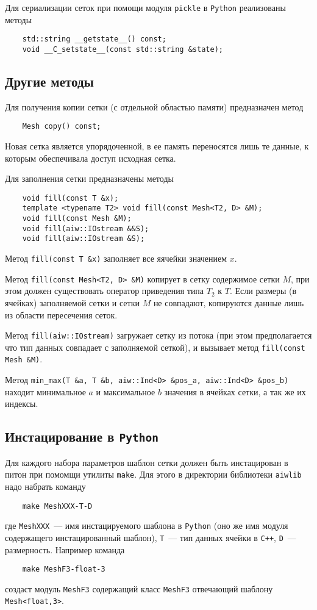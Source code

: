 Для сериализации сеток при помощи модуля \verb'pickle' в \verb'Python' реализованы методы
\begin{verbatim}		
    std::string __getstate__() const; 
    void __C_setstate__(const std::string &state);
\end{verbatim}

		
\subsection{Другие методы}
Для получения копии сетки (с отдельной областью памяти) предназначен метод
\begin{verbatim}		
    Mesh copy() const;
\end{verbatim}
Новая сетка является упорядоченной, в ее память переносятся лишь те данные, к которым обеспечивала доступ исходная сетка.

Для заполнения сетки предназначены методы		
\begin{verbatim}		
    void fill(const T &x);
    template <typename T2> void fill(const Mesh<T2, D> &M);
    void fill(const Mesh &M);
    void fill(aiw::IOstream &&S);
    void fill(aiw::IOstream &S);
\end{verbatim}
Метод \verb'fill(const T &x)' заполняет все яячейки значением $x$.

Метод \verb'fill(const Mesh<T2, D> &M)' копирует в сетку содержимое сетки $M$, при этом должен существовать оператор
приведения типа $T_2$ к $T$. Если размеры (в ячейках) заполняемой сетки и сетки $M$ не совпадают, копируются данные лишь из области пересечения 
сеток.

Метод \verb'fill(aiw::IOstream)' загружает сетку из потока (при этом предполагается что тип данных 
совпадает с заполняемой сеткой), и вызывает метод \verb'fill(const Mesh &M)'.

Метод \verb'min_max(T &a, T &b, aiw::Ind<D> &pos_a, aiw::Ind<D> &pos_b)' находит минимальное $a$ и максимальное $b$
значения в ячейках сетки, а так же их индексы.

\subsection{Инстацирование в {\tt Python}}
Для каждого набора параметров шаблон сетки должен быть инстацирован в питон при помомщи утилиты \verb'make'.
Для этого в директории библиотеки \verb'aiwlib' надо набрать команду
\begin{verbatim}		
    make MeshXXX-T-D
\end{verbatim}
где \verb'MeshXXX'~--- имя инстацируемого шаблона в \verb'Python' (оно же имя модуля содержащего инстацированный шаблон),
\verb'T'~--- тип данных ячейки в \verb'C++', \verb'D'~--- размерность.
 Например команда 
\begin{verbatim}		
    make MeshF3-float-3
\end{verbatim}
создаст модуль \verb'MeshF3' содержащий класс \verb'MeshF3' отвечающий шаблону \verb'Mesh<float,3>'.

